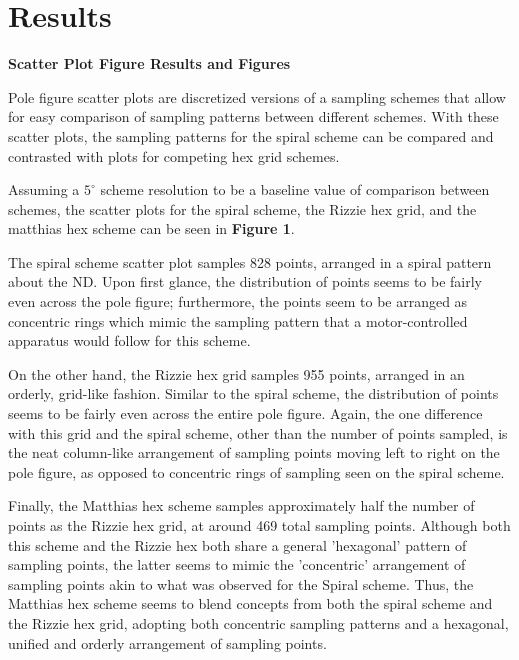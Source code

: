 \documentclass{article}
\begin{document}
\section{Results}





\textbf{Scatter Plot Figure Results and Figures}

    
Pole figure scatter plots are discretized versions of a sampling schemes that allow for easy comparison of sampling patterns between different schemes. With these scatter plots, the sampling patterns for the spiral scheme can be compared and contrasted with plots for competing hex grid schemes.

Assuming a $5^\circ$ scheme resolution to be a baseline value of comparison between schemes, the scatter plots for the spiral scheme, the Rizzie hex grid, and the matthias hex scheme can be seen in \textbf{Figure 1}. 

The spiral scheme scatter plot samples 828 points, arranged in a spiral pattern about the ND. Upon first glance, the distribution of points seems to be fairly even across the pole figure; furthermore, the points seem to be arranged as concentric rings which mimic the sampling pattern that a motor-controlled apparatus would follow for this scheme.

On the other hand, the Rizzie hex grid samples 955 points, arranged in an orderly, grid-like fashion. Similar to the spiral scheme, the distribution of points seems to be fairly even across the entire pole figure. Again, the one difference with this grid and the spiral scheme, other than the number of points sampled, is the neat column-like arrangement of sampling points moving left to right on the pole figure, as opposed to concentric rings of sampling seen on the spiral scheme.

Finally, the Matthias hex scheme samples approximately half the number of points as the Rizzie hex grid, at around 469 total sampling points. Although both this scheme and the Rizzie hex both share a general 'hexagonal' pattern of sampling points, the latter seems to mimic the 'concentric' arrangement of sampling points akin to what was observed for the Spiral scheme. Thus, the Matthias hex scheme seems to  blend concepts from both the spiral scheme and the Rizzie hex grid, adopting both concentric sampling patterns and a hexagonal, unified and orderly arrangement of sampling points.
\end{document}
